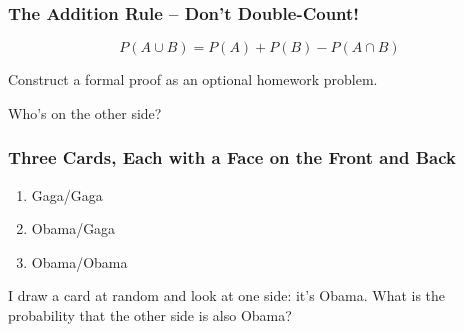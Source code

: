 \documentclass{beamer}
\begin{document}
\begin{frame}
\frametitle{The Addition Rule -- Don't Double-Count!}
$$P(A\cup B) = P(A) + P(B) - P(A\cap B)$$
\begin{figure}
\centering
{}
\end{figure}
\alert{Construct a formal proof as an optional homework problem.}
\end{frame}
\begin{frame}
\begin{center}\Huge Who's on the other side?\end{center}
\end{frame}
\begin{frame}
\frametitle{Three Cards, Each with a Face on the Front and Back}
\begin{figure}
\hspace{1em}
\end{figure}
\begin{enumerate}
	\item Gaga/Gaga
	\item Obama/Gaga
	\item Obama/Obama
\end{enumerate} 
\begin{alertblock}{I draw a card at random and look at one side: it's Obama. What is the probability that the other side is also Obama?\\\hfill}\end{alertblock}
\end{frame}
\end{document}
